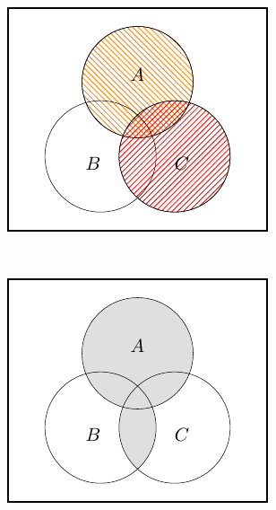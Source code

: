 \documentclass[
  a4paper,
]{book}
\theoremstyle{definition}
\theoremstyle{definition}
\theoremstyle{definition}
\theoremstyle{definition}
\theoremstyle{remark}
\begin{document}
~

\begin{center}\includegraphics[width=1\linewidth]{math1710_files/figure-latex/dist5-1} \end{center}

~

\begin{center}\includegraphics[width=1\linewidth]{math1710_files/figure-latex/dist6-1} \end{center}
\end{document}
